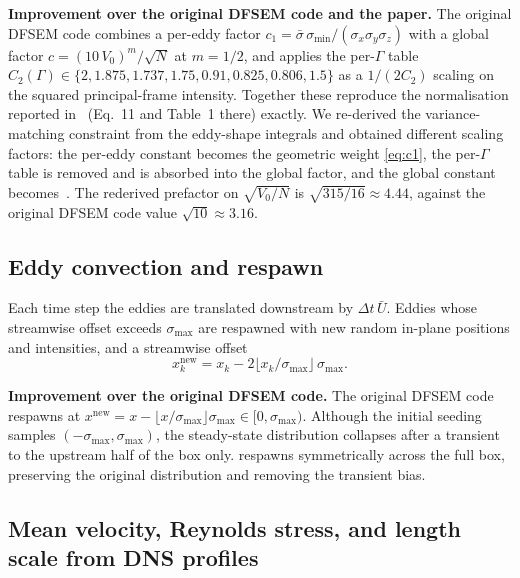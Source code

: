 \documentclass[
 amsmath,amssymb,
 aps,
 twocolumn,
]{revtex4-2}
\newcommand{\improv}[1]{\par\medskip\noindent\textbf{#1}\hspace{0.5em}\ignorespaces}
\begin{document}
\improv{Improvement over the original DFSEM code and the paper.}
The original DFSEM code combines a per-eddy factor
$c_1=\bar\sigma\,\sigma_{\min}/(\sigma_x\sigma_y\sigma_z)$ with a global
factor $c=(10\,V_0)^{m}/\sqrt N$ at $m=1/2$, and applies the per-$\Gamma$
table $C_2(\Gamma)\in\{2,1.875,1.737,1.75,0.91,0.825,0.806,1.5\}$ as a
$1/(2C_2)$ scaling on the squared principal-frame intensity. Together
these reproduce the normalisation reported in~\cite{PCR2013} (Eq.~11 and
Table~1 there) exactly. We re-derived the variance-matching constraint
from the eddy-shape integrals and obtained different scaling factors:
the per-eddy constant becomes the geometric weight \eqref{eq:c1}, the
per-$\Gamma$ table is removed and is absorbed into the global factor, and the global constant
becomes~. The rederived prefactor on $\sqrt{V_0/N}$ is
$\sqrt{315/16}\approx 4.44$, against the original DFSEM code value
$\sqrt{10}\approx 3.16$.

\subsection{Eddy convection and respawn}\label{sec:convect}

Each time step the eddies are translated downstream by $\Delta t\,\bar U$.
Eddies whose streamwise offset exceeds $\sigma_{\max}$ are respawned
with new random in-plane positions and intensities, and a streamwise
offset
\begin{equation}\label{eq:respawn}
  x_k^{\mathrm{new}}
    = x_k - 2\bigl\lfloor x_k/\sigma_{\max}\bigr\rfloor\,\sigma_{\max}.
\end{equation}

\improv{Improvement over the original DFSEM code.}
The original DFSEM code respawns at
$x^{\mathrm{new}}=x-\lfloor x/\sigma_{\max}\rfloor\sigma_{\max}\in[0,\sigma_{\max})$.
Although the initial seeding samples
$(-\sigma_{\max},\sigma_{\max})$, the steady-state distribution
collapses after a transient to the upstream half of the box only.
 respawns symmetrically across the full box, preserving
the original distribution and removing the transient bias.

\subsection{Mean velocity, Reynolds stress, and length scale from DNS
            profiles}\label{sec:Umean}
\end{document}
